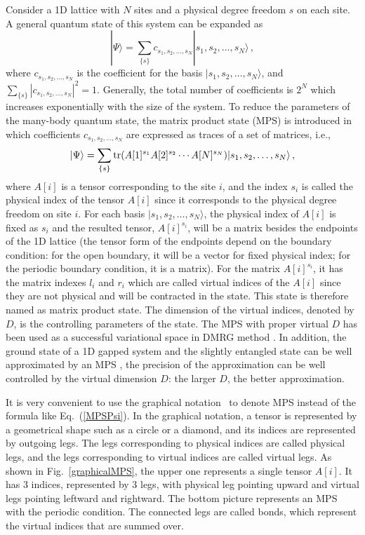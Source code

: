 \documentclass[preprint,3p,times,preprint,showpacs,amsmath,superscriptaddress,floatfix]{elsarticle}
\begin{document}
Consider a 1D lattice with $N$ sites and a physical degree freedom $s$ on each site. A general quantum state of this system can be expanded as
%
\begin{equation}
	|\Psi\rangle=\sum_{\{s\}}c_{s_1,s_2,\dots,s_N}|s_1,s_2,\dots,s_N\rangle \, ,
\end{equation}
where $c_{s_1,s_2,\dots,s_N}$ is the coefficient for the basis $|s_1,s_2,\dots,s_N\rangle$, and $\sum_{\{s\}}|c_{s_1,s_2,\dots,s_N}|^2=1$. Generally, the total number of coefficients is $2^N$ which increases exponentially with the size of the system.
To reduce the parameters of the many-body quantum state, the matrix product state (MPS) is introduced in which coefficients $c_{s_1,s_2,\dots,s_N}$ are expressed as traces of a set of matrices\cite{Schollwoeck2011,Schollwoeck2012}, i.e.,
\begin{equation}\label{MPSPsi}
|\Psi\rangle=\sum_{\{s\}}{\rm tr}(A[1]^{s_1}A[2]^{s_2}\cdots A[N]^{s_N})|s_1,s_2,\dots,s_N\rangle\, ,
\end{equation}
where $A[i]$ is a tensor corresponding to the site $i$, and the index $s_i$ is called the physical index of the tensor $A[i]$ since it corresponds to the physical degree freedom on site $i$. For each basis $|s_1,s_2,\dots,s_N\rangle$, the physical index of $A[i]$ is fixed as $s_i$ and the resulted tensor, $A[i]^{s_i}$, will be a matrix besides the endpoints of the 1D lattice (the tensor form of the endpoints depend on the boundary condition: for the open boundary, it will be a vector for fixed physical index; for the periodic boundary condition, it is a matrix). For the matrix $A[i]^{s_i}$, it has the matrix indexes $l_i$ and $r_i$ which are called virtual indices of the $A[i]$ since they are not physical and will be contracted in the state. This state is therefore named as matrix product state. The dimension of the virtual indices, denoted by $D$, is the controlling parameters of the state. The MPS with proper virtual $D$ has been used as a successful variational space in DMRG method \cite{Schollwoeck2011}. In addition, the ground state of a 1D gapped system and the slightly entangled state can be well approximated by an MPS \cite{Hastings2007}, the precision of the approximation can be well controlled by the virtual dimension $D$: the larger $D$, the better approximation.

It is very convenient to use the graphical notation~\cite{Schollwoeck2012} to denote MPS instead of the formula like Eq.~(\ref{MPSPsi}). In the graphical notation, a tensor is represented by a geometrical shape such as a circle or a diamond, and its indices are represented by outgoing legs. The legs corresponding to physical indices are called physical legs, and the legs corresponding to virtual indices are called virtual legs. As shown in Fig.~\ref{graphicalMPS}, the upper one  represents a single tensor $A[i]$. It has 3 indices, represented by 3 legs, with physical leg pointing upward and virtual legs pointing leftward and rightward. The bottom picture represents an MPS with the periodic condition. The connected legs are called bonds, which represent the virtual indices that are summed over.
\end{document}
